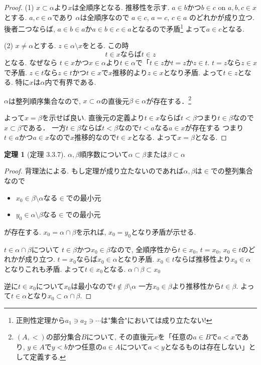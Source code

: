 \documentclass[dvipdfmx,a4paper,11pt]{article}
\theoremstyle{definition}
\newtheorem{thm}{定理}
\begin{document}
\begin{proof}
(1) $x \subset \alpha$より$x$は全順序となる. 推移性を示す.
$a \in b$かつ$b \in c$ on $a,b,c \in x$とする. 
$a,c \in \alpha$であり
$\alpha$は全順序なので
$a \in c$, $a = c$, $c \in a$
のどれかが成り立つ.
後者二つならば, $a \in b \in a$か$a \in b \in c \in a$となるので矛盾\footnote{正則性定理から$a_1 \ni a_2 \ni \cdots$は"集合"においては成り立たない!}
よって$a \in c$となる. 

(2) $x \neq \alpha$とする.
$z \in \alpha \setminus x$をとる.
この時
$$
t \in x \text{ならば} t \in z
$$
となる. なぜなら
$t \in x$かつ$x \in \alpha$より$t \in \alpha$で「$t\in z$か$t=z$か$z \in t$.
$t=z$なら$z \in x$で矛盾.
$z\in t$なら$z \in t$かつ$t \in x$で$x$推移的より$z \in x$となり矛盾.
よって$t \in z$となる.
特に$x$は$\alpha$内で有界である.

$\alpha$は整列順序集合なので, $x \subset \alpha$の直後元$\beta \in \alpha$が存在する．\footnote{$(A,<)$の部分集合$B$について, その直後元$x$を「任意の$a \in B$で$a < x$であり, $y \in A$で$y <b$かつ任意の$a \in A$について$a <y$となるものは存在しない」として定義する.}

よって$x = \beta$を示せば良い.
直後元の定義より$t \in x$ならば$t<\beta$つまり$t\in \beta$なので$x \subset \beta$である．
一方$t \in \beta$ならば$t < \beta$なので$t < a$なる$a \in x$が存在する
つまり$t \in a$かつ$a \in x$なので$x$推移的なので$t \in x$となる. よって$x  = \beta$となる.

\end{proof}

 \begin{tcolorbox}
 [colback = white, colframe = green!35!black, fonttitle = \bfseries,breakable = true]
\begin{thm}[定理 3.3.7]
\label{thm-tanaka-3.3.7}
$\alpha, \beta$順序数について$\alpha \subset \beta$または$\beta \subset \alpha$
\end{thm}
\end{tcolorbox}

\begin{proof}
背理法による. 
もし定理が成り立たないのであれば$\alpha, \beta$は$\in$での整列集合なので
\begin{itemize}
\item $x_0 \in \beta \setminus \alpha$なる$\in$での最小元
\item $y_0 \in  \alpha \setminus \beta$なる$\in$での最小元
\end{itemize}
が存在する.
$x_0 = \alpha \cap \beta$を示れば, $x_0=y_0$となり矛盾が示せる.

$t \in \alpha \cap \beta$について
$t \in \beta$かつ$x_0 \in \beta$なので, 全順序性から$t \in x_0$, $t =x_0$, $x_0 \in t$のどれかが成り立つ. 
$t =x_0$ならば$x_0 \in \alpha$となり矛盾. $x_0 \in t$ならば推移性より$x_0 \in \alpha$となりこれも矛盾. よって$t \in x_0$となる. $\alpha \cap \beta \subset x_0$

逆に$t \in x_0$について$x_0$は最小なので$t \not \in \beta \setminus \alpha$
一方$x_0 \in \beta$より推移性から$t \in \beta$. よって$t \in \alpha$となり$x_0 \subset \alpha \cap \beta$.
\end{proof}
\end{document}
